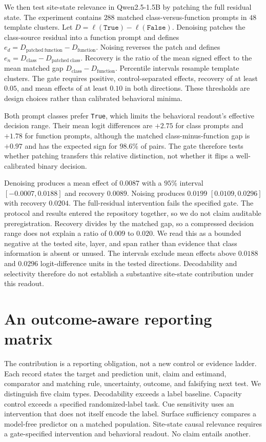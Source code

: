 \documentclass{article}
\begin{document}
We then test site-state relevance in Qwen2.5-1.5B by patching the full residual
state. The experiment contains $288$ matched class-versus-function prompts in
$48$ template clusters. Let
$D=\ell(\texttt{True})-\ell(\texttt{False})$. Denoising patches the
class-source residual into a function prompt and defines
$e_d=D_{\mathrm{patched\ function}}-D_{\mathrm{function}}$. Noising reverses
the patch and defines
$e_n=D_{\mathrm{class}}-D_{\mathrm{patched\ class}}$. Recovery is the ratio of
the mean signed effect to the mean matched gap
$D_{\mathrm{class}}-D_{\mathrm{function}}$. Percentile intervals resample
template clusters. The gate requires positive, control-separated effects,
recovery of at least $0.05$, and mean effects of at least $0.10$ in both
directions. These thresholds are design choices rather than calibrated
behavioral minima.

Both prompt classes prefer \texttt{True}, which limits the behavioral
readout's effective decision range. Their mean logit differences are $+2.75$ for class prompts and
$+1.78$ for function prompts, although the matched class-minus-function gap is
$+0.97$ and has the expected sign for $98.6\%$ of pairs. The gate therefore
tests whether patching transfers this relative distinction, not whether it
flips a well-calibrated binary decision.

Denoising produces a mean effect of $0.0087$ with a $95\%$ interval
$[-0.0007,0.0188]$ and recovery $0.0089$. Noising produces $0.0199$
$[0.0109,0.0296]$ with recovery $0.0204$. The full-residual intervention fails
the specified gate. The protocol and results entered the repository together,
so we do not claim auditable preregistration. Recovery divides by the matched
gap, so a compressed decision range does not explain a ratio of $0.009$ to
$0.020$. We read this as a bounded negative at the tested site, layer, and
span rather than evidence that class information is absent or unused. The
intervals exclude mean effects above $0.0188$ and $0.0296$ logit-difference
units in the tested directions. Decodability and selectivity therefore do not
establish a substantive site-state contribution under this readout.

\section{An outcome-aware reporting matrix}

The contribution is a reporting obligation, not a new control or evidence
ladder. Each record states the target and prediction unit, claim and estimand,
comparator and matching rule, uncertainty, outcome, and falsifying next test.
We distinguish five claim types. Decodability exceeds a label baseline.
Capacity control exceeds a specified randomized-label task. Cue sensitivity
uses an intervention that does not itself encode the label. Surface
sufficiency compares a model-free predictor on a matched population.
Site-state causal relevance requires a gate-specified intervention and
behavioral readout. No claim entails another.
\end{document}
